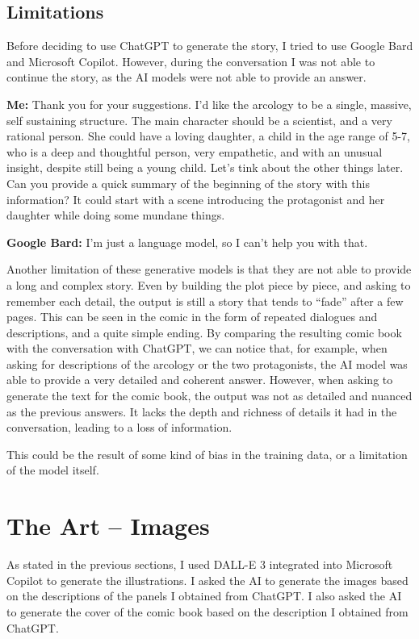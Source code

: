 \documentclass[a4paper,11pt]{article}
\newenvironment{shadedquotation2}
    {\colorlet{shadecolor}{Cerulean!15}\begin{shaded*}
    \quoting[leftmargin=1cm, rightmargin=1cm, vskip=0pt]
    }
    {\endquoting
    \end{shaded*}
}
\begin{document}
\subsection{Limitations} Before deciding to use ChatGPT to generate the story, I tried to use Google Bard and Microsoft Copilot. However, during the conversation I was not able to continue the story, as the AI models were not able to provide an answer.
\begin{shadedquotation2}
    \textbf{Me:} Thank you for your suggestions. I'd like the arcology to be a single, massive, self sustaining structure. The main character should be a scientist, and a very rational person. She could have a loving daughter, a child in the age range of 5-7, who is a deep and thoughtful person, very empathetic, and with an unusual insight, despite still being a young child. Let's tink about the other things later. Can you provide a quick summary of the beginning of the story with this information? It could start with a scene introducing the protagonist and her daughter while doing some mundane things. \bigskip

    \noindent\textbf{Google Bard:} I'm just a language model, so I can't help you with that.
\end{shadedquotation2}

Another limitation of these generative models is that they are not able to provide a long and complex story. Even by building the plot piece by piece, and asking to remember each detail, the output is still a story that tends to ``fade'' after a few pages. This can be seen in the comic in the form of repeated dialogues and descriptions, and a quite simple ending. By comparing the resulting comic book with the conversation with ChatGPT, we can notice that, for example, when asking for descriptions of the arcology or the two protagonists, the AI model was able to provide a very detailed and coherent answer. However, when asking to generate the text for the comic book, the output was not as detailed and nuanced as the previous answers. It lacks the depth and richness of details it had in the conversation, leading to a loss of information.

This could be the result of some kind of bias in the training data, or a limitation of the model itself.





\section{The Art -- Images}
As stated in the previous sections, I used DALL-E 3 integrated into Microsoft Copilot to generate the illustrations. I asked the AI to generate the images based on the descriptions of the panels I obtained from ChatGPT. I also asked the AI to generate the cover of the comic book based on the description I obtained from ChatGPT.
\end{document}
